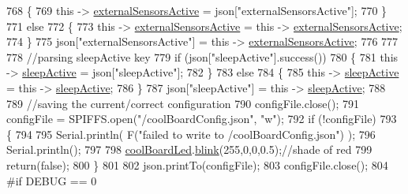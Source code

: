 \begin{DoxyCode}
768             \{
769                 \textcolor{keyword}{this} -> \hyperlink{class_cool_board_a638b00b76aeb819ecfd4c10b8cdd7bb7}{externalSensorsActive} = json[\textcolor{stringliteral}{"externalSensorsActive"}];
770             \}
771             \textcolor{keywordflow}{else}
772             \{
773                 \textcolor{keyword}{this} -> \hyperlink{class_cool_board_a638b00b76aeb819ecfd4c10b8cdd7bb7}{externalSensorsActive} = \textcolor{keyword}{this} -> 
      \hyperlink{class_cool_board_a638b00b76aeb819ecfd4c10b8cdd7bb7}{externalSensorsActive};
774             \}
775             json[\textcolor{stringliteral}{"externalSensorsActive"}] = \textcolor{keyword}{this} -> \hyperlink{class_cool_board_a638b00b76aeb819ecfd4c10b8cdd7bb7}{externalSensorsActive};
776 
777             
778             \textcolor{comment}{//parsing sleepActive key}
779             \textcolor{keywordflow}{if} (json[\textcolor{stringliteral}{"sleepActive"}].success())
780             \{
781                 \textcolor{keyword}{this} -> \hyperlink{class_cool_board_a0a51b2287139f66c738101fb53139230}{sleepActive} = json[\textcolor{stringliteral}{"sleepActive"}];
782             \}
783             \textcolor{keywordflow}{else}
784             \{
785                 \textcolor{keyword}{this} -> \hyperlink{class_cool_board_a0a51b2287139f66c738101fb53139230}{sleepActive} = \textcolor{keyword}{this} -> \hyperlink{class_cool_board_a0a51b2287139f66c738101fb53139230}{sleepActive};
786             \}
787             json[\textcolor{stringliteral}{"sleepActive"}] = \textcolor{keyword}{this} -> \hyperlink{class_cool_board_a0a51b2287139f66c738101fb53139230}{sleepActive};
788 
789             \textcolor{comment}{//saving the current/correct configuration}
790             configFile.close();
791             configFile = SPIFFS.open(\textcolor{stringliteral}{"/coolBoardConfig.json"}, \textcolor{stringliteral}{"w"});
792             \textcolor{keywordflow}{if} (!configFile)
793             \{
794             
795                 Serial.println( F(\textcolor{stringliteral}{"failed to write to /coolBoardConfig.json"}) );
796                 Serial.println();
797 
798                 \hyperlink{class_cool_board_a1b1d3c684a5baa56b08486e192fd8e97}{coolBoardLed}.\hyperlink{class_cool_board_led_a96e1ea13003eee34c9dbcef340404426}{blink}(255,0,0,0.5);\textcolor{comment}{//shade of red     }
799                 \textcolor{keywordflow}{return}(\textcolor{keyword}{false});
800             \}
801 
802             json.printTo(configFile);
803             configFile.close();
804 \textcolor{preprocessor}{            #if DEBUG == 0}

\end{DoxyCode}
